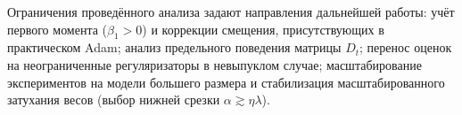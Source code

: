 Ограничения проведённого анализа задают направления дальнейшей работы: учёт первого момента ($\beta_1 > 0$) и коррекции смещения, присутствующих в практическом Adam; анализ предельного поведения матрицы $D_t$; перенос оценок на неограниченные регуляризаторы в невыпуклом случае; масштабирование экспериментов на модели большего размера и стабилизация масштабированного затухания весов (выбор нижней срезки $\alpha \gtrsim \eta\lambda$).
